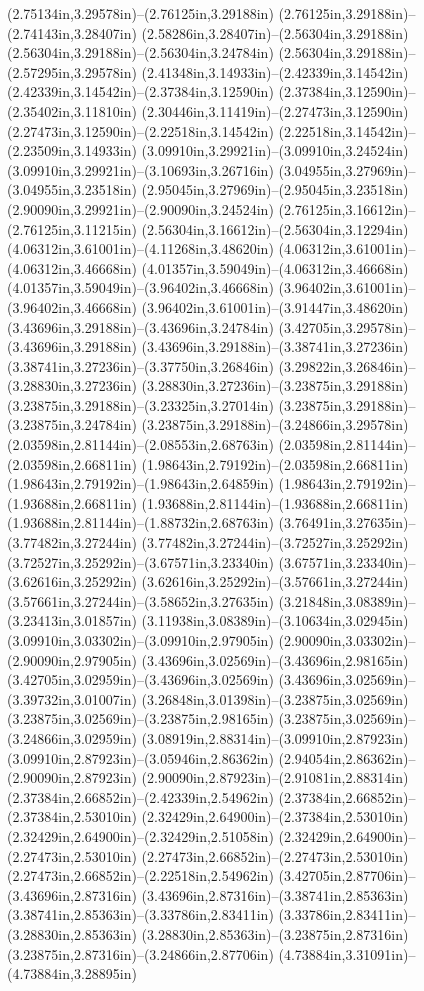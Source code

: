 (2.75134in,3.29578in)--(2.76125in,3.29188in) (2.76125in,3.29188in)--(2.74143in,3.28407in) (2.58286in,3.28407in)--(2.56304in,3.29188in) (2.56304in,3.29188in)--(2.56304in,3.24784in) (2.56304in,3.29188in)--(2.57295in,3.29578in) (2.41348in,3.14933in)--(2.42339in,3.14542in) (2.42339in,3.14542in)--(2.37384in,3.12590in) (2.37384in,3.12590in)--(2.35402in,3.11810in) (2.30446in,3.11419in)--(2.27473in,3.12590in) (2.27473in,3.12590in)--(2.22518in,3.14542in) (2.22518in,3.14542in)--(2.23509in,3.14933in) (3.09910in,3.29921in)--(3.09910in,3.24524in) (3.09910in,3.29921in)--(3.10693in,3.26716in) (3.04955in,3.27969in)--(3.04955in,3.23518in) (2.95045in,3.27969in)--(2.95045in,3.23518in) (2.90090in,3.29921in)--(2.90090in,3.24524in) (2.76125in,3.16612in)--(2.76125in,3.11215in) (2.56304in,3.16612in)--(2.56304in,3.12294in) (4.06312in,3.61001in)--(4.11268in,3.48620in) (4.06312in,3.61001in)--(4.06312in,3.46668in) (4.01357in,3.59049in)--(4.06312in,3.46668in) (4.01357in,3.59049in)--(3.96402in,3.46668in) (3.96402in,3.61001in)--(3.96402in,3.46668in) (3.96402in,3.61001in)--(3.91447in,3.48620in) (3.43696in,3.29188in)--(3.43696in,3.24784in) (3.42705in,3.29578in)--(3.43696in,3.29188in) (3.43696in,3.29188in)--(3.38741in,3.27236in) (3.38741in,3.27236in)--(3.37750in,3.26846in) (3.29822in,3.26846in)--(3.28830in,3.27236in) (3.28830in,3.27236in)--(3.23875in,3.29188in) (3.23875in,3.29188in)--(3.23325in,3.27014in) (3.23875in,3.29188in)--(3.23875in,3.24784in) (3.23875in,3.29188in)--(3.24866in,3.29578in) (2.03598in,2.81144in)--(2.08553in,2.68763in) (2.03598in,2.81144in)--(2.03598in,2.66811in) (1.98643in,2.79192in)--(2.03598in,2.66811in) (1.98643in,2.79192in)--(1.98643in,2.64859in) (1.98643in,2.79192in)--(1.93688in,2.66811in) (1.93688in,2.81144in)--(1.93688in,2.66811in) (1.93688in,2.81144in)--(1.88732in,2.68763in) (3.76491in,3.27635in)--(3.77482in,3.27244in) (3.77482in,3.27244in)--(3.72527in,3.25292in) (3.72527in,3.25292in)--(3.67571in,3.23340in) (3.67571in,3.23340in)--(3.62616in,3.25292in) (3.62616in,3.25292in)--(3.57661in,3.27244in) (3.57661in,3.27244in)--(3.58652in,3.27635in) (3.21848in,3.08389in)--(3.23413in,3.01857in) (3.11938in,3.08389in)--(3.10634in,3.02945in) (3.09910in,3.03302in)--(3.09910in,2.97905in) (2.90090in,3.03302in)--(2.90090in,2.97905in) (3.43696in,3.02569in)--(3.43696in,2.98165in) (3.42705in,3.02959in)--(3.43696in,3.02569in) (3.43696in,3.02569in)--(3.39732in,3.01007in) (3.26848in,3.01398in)--(3.23875in,3.02569in) (3.23875in,3.02569in)--(3.23875in,2.98165in) (3.23875in,3.02569in)--(3.24866in,3.02959in) (3.08919in,2.88314in)--(3.09910in,2.87923in) (3.09910in,2.87923in)--(3.05946in,2.86362in) (2.94054in,2.86362in)--(2.90090in,2.87923in) (2.90090in,2.87923in)--(2.91081in,2.88314in) (2.37384in,2.66852in)--(2.42339in,2.54962in) (2.37384in,2.66852in)--(2.37384in,2.53010in) (2.32429in,2.64900in)--(2.37384in,2.53010in) (2.32429in,2.64900in)--(2.32429in,2.51058in) (2.32429in,2.64900in)--(2.27473in,2.53010in) (2.27473in,2.66852in)--(2.27473in,2.53010in) (2.27473in,2.66852in)--(2.22518in,2.54962in) (3.42705in,2.87706in)--(3.43696in,2.87316in) (3.43696in,2.87316in)--(3.38741in,2.85363in) (3.38741in,2.85363in)--(3.33786in,2.83411in) (3.33786in,2.83411in)--(3.28830in,2.85363in) (3.28830in,2.85363in)--(3.23875in,2.87316in) (3.23875in,2.87316in)--(3.24866in,2.87706in) (4.73884in,3.31091in)--(4.73884in,3.28895in) 
